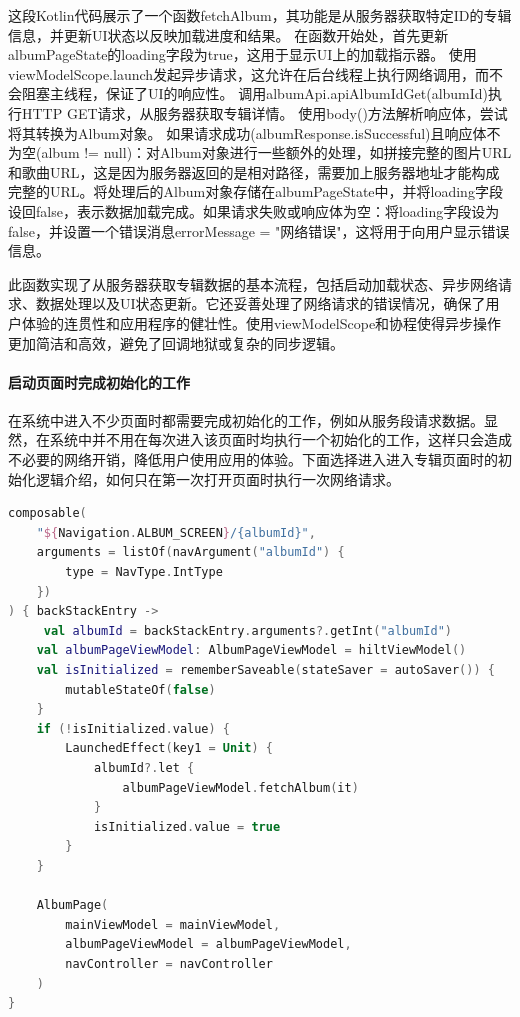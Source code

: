 \documentclass[main.tex]{subfiles}
\begin{document}
这段Kotlin代码展示了一个函数fetchAlbum，其功能是从服务器获取特定ID的专辑信息，并更新UI状态以反映加载进度和结果。
在函数开始处，首先更新albumPageState的loading字段为true，这用于显示UI上的加载指示器。
使用viewModelScope.launch发起异步请求，这允许在后台线程上执行网络调用，而不会阻塞主线程，保证了UI的响应性。
调用albumApi.apiAlbumIdGet(albumId)执行HTTP GET请求，从服务器获取专辑详情。
使用body()方法解析响应体，尝试将其转换为Album对象。
如果请求成功(albumResponse.isSuccessful)且响应体不为空(album != null)：对Album对象进行一些额外的处理，如拼接完整的图片URL和歌曲URL，这是因为服务器返回的是相对路径，需要加上服务器地址才能构成完整的URL。将处理后的Album对象存储在albumPageState中，并将loading字段设回false，表示数据加载完成。如果请求失败或响应体为空：将loading字段设为false，并设置一个错误消息errorMessage = "网络错误"，这将用于向用户显示错误信息。

此函数实现了从服务器获取专辑数据的基本流程，包括启动加载状态、异步网络请求、数据处理以及UI状态更新。它还妥善处理了网络请求的错误情况，确保了用户体验的连贯性和应用程序的健壮性。使用viewModelScope和协程使得异步操作更加简洁和高效，避免了回调地狱或复杂的同步逻辑。

\paragraph{启动页面时完成初始化的工作}

在系统中进入不少页面时都需要完成初始化的工作，例如从服务段请求数据。显然，在系统中并不用在每次进入该页面时均执行一个初始化的工作，这样只会造成不必要的网络开销，降低用户使用应用的体验。下面选择进入进入专辑页面时的初始化逻辑介绍，如何只在第一次打开页面时执行一次网络请求。

\begin{lstlisting}[language=Kotlin]
composable(
    "${Navigation.ALBUM_SCREEN}/{albumId}",
    arguments = listOf(navArgument("albumId") {
        type = NavType.IntType
    })
) { backStackEntry ->
     val albumId = backStackEntry.arguments?.getInt("albumId")
    val albumPageViewModel: AlbumPageViewModel = hiltViewModel()
    val isInitialized = rememberSaveable(stateSaver = autoSaver()) {
        mutableStateOf(false)
    }
    if (!isInitialized.value) {
        LaunchedEffect(key1 = Unit) {
            albumId?.let {
                albumPageViewModel.fetchAlbum(it)
            }
            isInitialized.value = true
        }
    }
    
    AlbumPage(
        mainViewModel = mainViewModel,
        albumPageViewModel = albumPageViewModel,
        navController = navController
    )
}
\end{lstlisting}
\end{document}
